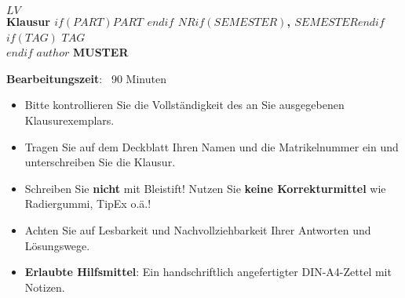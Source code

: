 
\begin{coverpages}
    \begin{minipage}[c]{0.75\textwidth}
        \parindent0pt
        \textcolor{headcolor}{\large\scshape{$LV$}}\\[1ex] 
        \textcolor{headcolor}{\Large\textbf{Klausur $if(PART)$$PART$ \xspace$endif$ $NR$$if(SEMESTER)$, $SEMESTER$$endif$}}\\[2ex]
        $if(TAG)$
        \textbf{$TAG$}\\[2ex]
        $endif$
        \parindent0pt
        $author$
        \ifprintanswers
            \hfill\textcolor{dkred}{\textbf{\Huge MUSTER}}\hfill\hfill
        \fi
    \end{minipage}
    \begin{minipage}[c]{0.2\textwidth}
        \hslogoscaled{38mm}
    \end{minipage}
    \vspace{10mm}
    \par\hrulefill\par
    \begin{minipage}[c]{0.5\textwidth}
        \begin{minipage}[c]{0.96\textwidth}
        \vspace{2mm}
            {\textbf{Bearbeitungszeit}: {\ }90 Minuten}\par
            \medskip
            \begin{itemize}
            \item Bitte kontrollieren Sie die Vollständigkeit des an Sie 
            ausgegebenen Klausurexemplars.
            \item Tragen Sie auf dem Deckblatt Ihren Namen und die
            Matrikelnummer ein und unterschreiben Sie die Klausur.
            \item Schreiben Sie \textbf{nicht} mit Bleistift! Nutzen Sie
            \textbf{keine Korrekturmittel} wie Radiergummi, TipEx o.ä.!
            \item Achten Sie auf Lesbarkeit und Nachvollziehbarkeit Ihrer 
            Antworten und Lösungswege.
            \item \textbf{Erlaubte Hilfsmittel}: Ein handschriftlich 
            angefertigter DIN-A4-Zettel mit Notizen.
            

\end{itemize}
\end{minipage}
\end{minipage}
\end{coverpages}
